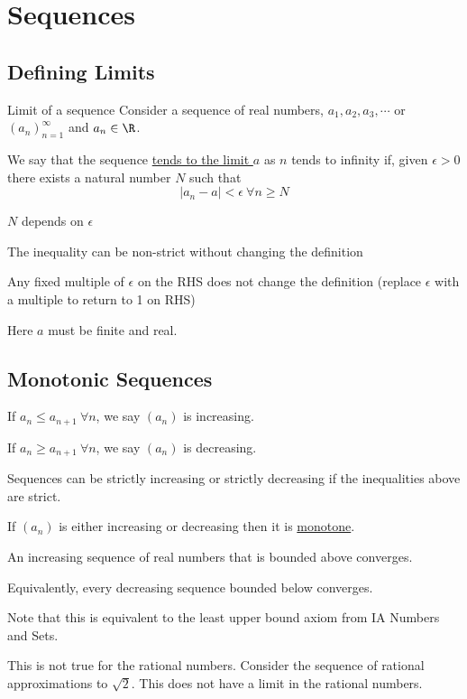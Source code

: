 \documentclass[../Main.tex]{subfiles}
\begin{document}
\section{Sequences}
\subsection{Defining Limits}
\begin{definition}{Limit of a sequence}
    Consider a sequence of real numbers, $a_1, a_2, a_3, \cdots$ or $(a_n)_{n=1}^\infty$ and $a_n \in \R$.\par
    We say that the sequence \underline{tends to the limit $a$} as $n$ tends to infinity if, given $\epsilon > 0$ there exists a natural number $N$ such that
    \begin{equation}
        |a_n - a| < \epsilon~\forall n \geq N
        \label{eqnSequenceConvergence}
    \end{equation}
\end{definition}
\begin{remarks}
    \item $N$ depends on $\epsilon$
    \item The inequality can be non-strict without changing the definition
    \item Any fixed multiple of $\epsilon$ on the RHS does not change the definition (replace $\epsilon$ with a multiple to return to 1 on RHS)
    \item Here $a$ must be finite and real.
\end{remarks}
\subsection{Monotonic Sequences}
If $a_n \leq a_{n+1}~\forall n$, we say $(a_n)$ is increasing.\par
If $a_n \geq a_{n+1}~\forall n$, we say $(a_n)$ is decreasing.\par
Sequences can be strictly increasing or strictly decreasing if the inequalities above are strict.\par
If $(a_n)$ is either increasing or decreasing then it is \underline{monotone}.\par
\begin{proposition}
    An increasing sequence of real numbers that is bounded above converges.
\end{proposition}
\begin{remarks}
    \item Equivalently, every decreasing sequence bounded below converges.
    \item Note that this is equivalent to the least upper bound axiom from IA Numbers and Sets.
    \item This is not true for the rational numbers. Consider the sequence of rational approximations to $\sqrt{2}$. This does not have a limit in the rational numbers.
\end{remarks}
\end{document}
